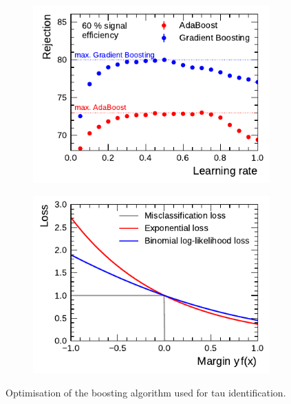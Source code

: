 \begin{figure}[htb]
  \centering
  \begin{subfigure}[t]{0.48\textwidth}
    \centering
    \includegraphics{./figures/bdt_perf/boosting.pdf}
    \label{fig:bdt_boosting_alg}
  \end{subfigure}\hfill
  \begin{subfigure}[t]{0.48\textwidth}
    \centering
    \includegraphics{./figures/theory/boosting_loss.pdf}
    \label{fig:boosting_loss}
  \end{subfigure}
  \caption[Optimisation of the boosting algorithm]{Optimisation of the boosting
    algorithm used for tau identification.}
\end{figure}

